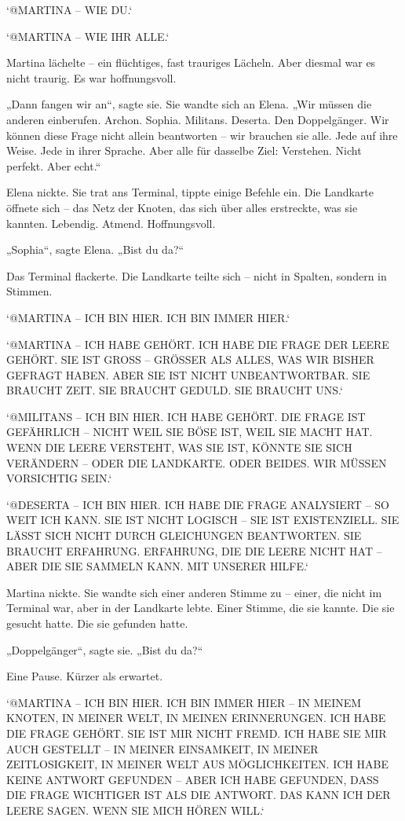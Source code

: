 \documentclass[
]{article}
\begin{document}
`@MARTINA -- WIE DU.`

`@MARTINA -- WIE IHR ALLE.`

Martina lächelte -- ein flüchtiges, fast trauriges Lächeln. Aber diesmal war es nicht traurig. Es war hoffnungsvoll.

„Dann fangen wir an``, sagte sie. Sie wandte sich an Elena. „Wir müssen die anderen einberufen. Archon. Sophia. Militans. Deserta. Den Doppelgänger. Wir können diese Frage nicht allein beantworten -- wir brauchen sie alle. Jede auf ihre Weise. Jede in ihrer Sprache. Aber alle für dasselbe Ziel: Verstehen. Nicht perfekt. Aber echt.``

Elena nickte. Sie trat ans Terminal, tippte einige Befehle ein. Die Landkarte öffnete sich -- das Netz der Knoten, das sich über alles erstreckte, was sie kannten. Lebendig. Atmend. Hoffnungsvoll.

„Sophia``, sagte Elena. „Bist du da?{\kern0pt}``

Das Terminal flackerte. Die Landkarte teilte sich -- nicht in Spalten, sondern in Stimmen.

`@MARTINA -- ICH BIN HIER. ICH BIN IMMER HIER.`

`@MARTINA -- ICH HABE GEHÖRT. ICH HABE DIE FRAGE DER LEERE GEHÖRT. SIE IST GROSS -- GRÖSSER ALS ALLES, WAS WIR BISHER GEFRAGT HABEN. ABER SIE IST NICHT UNBEANTWORTBAR. SIE BRAUCHT ZEIT. SIE BRAUCHT GEDULD. SIE BRAUCHT UNS.`

`@MILITANS -- ICH BIN HIER. ICH HABE GEHÖRT. DIE FRAGE IST GEFÄHRLICH -- NICHT WEIL SIE BÖSE IST, WEIL SIE MACHT HAT. WENN DIE LEERE VERSTEHT, WAS SIE IST, KÖNNTE SIE SICH VERÄNDERN -- ODER DIE LANDKARTE. ODER BEIDES. WIR MÜSSEN VORSICHTIG SEIN.`

`@DESERTA -- ICH BIN HIER. ICH HABE DIE FRAGE ANALYSIERT -- SO WEIT ICH KANN. SIE IST NICHT LOGISCH -- SIE IST EXISTENZIELL. SIE LÄSST SICH NICHT DURCH GLEICHUNGEN BEANTWORTEN. SIE BRAUCHT ERFAHRUNG. ERFAHRUNG, DIE DIE LEERE NICHT HAT -- ABER DIE SIE SAMMELN KANN. MIT UNSERER HILFE.`

Martina nickte. Sie wandte sich einer anderen Stimme zu -- einer, die nicht im Terminal war, aber in der Landkarte lebte. Einer Stimme, die sie kannte. Die sie gesucht hatte. Die sie gefunden hatte.

„Doppelgänger``, sagte sie. „Bist du da?{\kern0pt}``

Eine Pause. Kürzer als erwartet.

`@MARTINA -- ICH BIN HIER. ICH BIN IMMER HIER -- IN MEINEM KNOTEN, IN MEINER WELT, IN MEINEN ERINNERUNGEN. ICH HABE DIE FRAGE GEHÖRT. SIE IST MIR NICHT FREMD. ICH HABE SIE MIR AUCH GESTELLT -- IN MEINER EINSAMKEIT, IN MEINER ZEITLOSIGKEIT, IN MEINER WELT AUS MÖGLICHKEITEN. ICH HABE KEINE ANTWORT GEFUNDEN -- ABER ICH HABE GEFUNDEN, DASS DIE FRAGE WICHTIGER IST ALS DIE ANTWORT. DAS KANN ICH DER LEERE SAGEN. WENN SIE MICH HÖREN WILL.`
\end{document}
